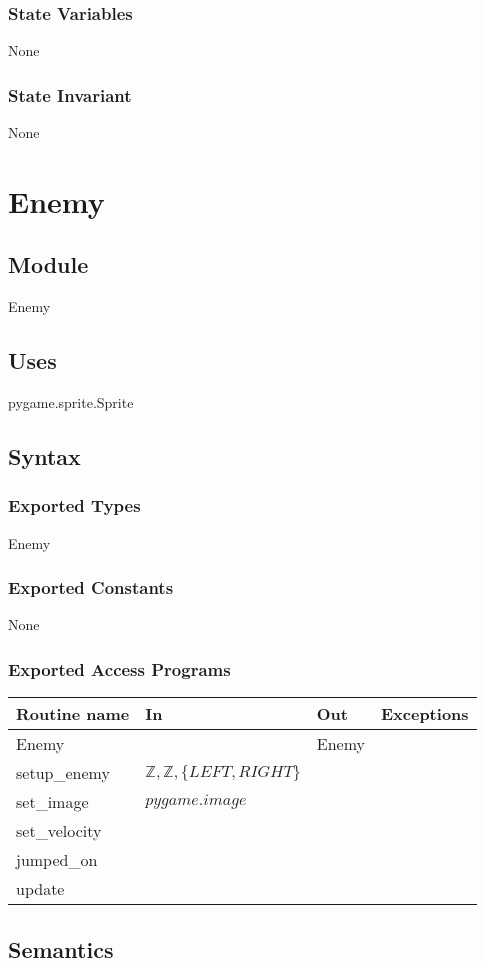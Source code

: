 \documentclass[12pt]{article}
\begin{document}
\subsubsection* {State Variables}
None
\subsubsection* {State Invariant}
None
\newpage

\section* {Enemy}
\subsection* {Module}
Enemy
\subsection* {Uses}
pygame.sprite.Sprite
\subsection* {Syntax}
\subsubsection* {Exported Types}
Enemy
\subsubsection* {Exported Constants}
None
\subsubsection* {Exported Access Programs}
\begin{tabular}{| l | l | l | p{3.5cm} |}
\hline
\textbf{Routine name} & \textbf{In} & \textbf{Out} & \textbf{Exceptions}\\
\hline
Enemy & ~ & Enemy & ~\\
\hline
setup\_enemy & $\mathbb{Z},\mathbb{Z},\{LEFT, RIGHT\}$ & ~ & ~\\
\hline
set\_image & $pygame.image$ & ~ & ~\\
\hline
set\_velocity & ~ & ~ & ~\\
\hline
jumped\_on & ~ & ~ & ~\\
\hline
update & ~ & ~\\
\hline
\end{tabular}

\subsection* {Semantics}
\end{document}
